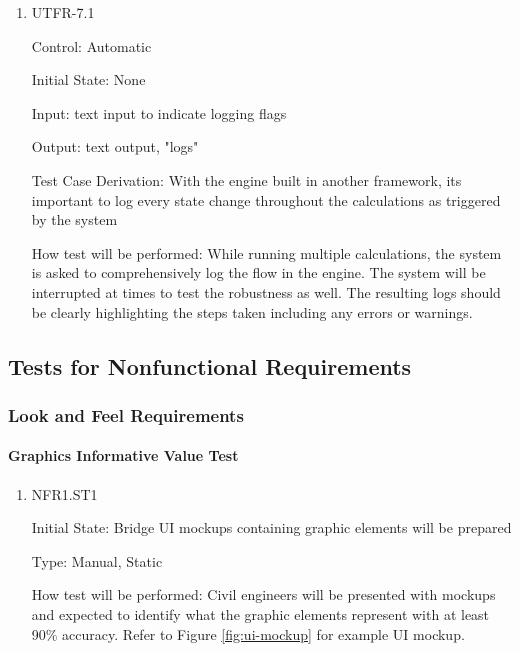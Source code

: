 \documentclass[12pt, titlepage]{article}
\begin{document}
\begin{enumerate}

\item{UTFR-7.1\\}

Control: Automatic
					
Initial State: None
					
Input: text input to indicate logging flags 
					
Output: text output, "logs"

Test Case Derivation: With the engine built in another framework, its important to log every state change throughout the calculations as triggered by the system

How test will be performed: While running multiple calculations, the system is asked to comprehensively log the flow in the engine. The system will be interrupted at times to test the robustness as well. The resulting logs should be clearly highlighting the steps taken including any errors or warnings.
					

\end{enumerate}


\subsection{Tests for Nonfunctional Requirements}



\subsubsection{Look and Feel Requirements}
		
\paragraph{Graphics Informative Value Test}

\begin{enumerate}

\item{NFR1.ST1\\}

Initial State: Bridge UI mockups containing graphic elements will be prepared

Type: Manual, Static

How test will be performed: Civil engineers will be presented with mockups and expected to identify what the graphic elements represent with at least 90\% accuracy. Refer to Figure \ref{fig:ui-mockup} for example UI mockup.

\end{enumerate}
\end{document}
